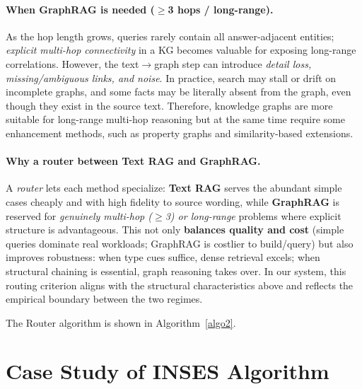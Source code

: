 \documentclass{article}
\theoremstyle{plain}
\theoremstyle{definition}
\theoremstyle{remark}
\begin{document}
\paragraph{When GraphRAG is needed (\texorpdfstring{$\ge$}{>=}3 hops / long-range).}
As the hop length grows, queries rarely contain all answer-adjacent entities; \emph{explicit multi-hop connectivity} in a KG becomes valuable for exposing long-range correlations. However, the text$\to$graph step can introduce \emph{detail loss, missing/ambiguous links, and noise}. In practice, search may stall or drift on incomplete graphs, and some facts may be literally absent from the graph, even though they exist in the source text. Therefore, knowledge graphs are more suitable for long-range multi-hop reasoning but at the same time require some enhancement methods, such as property graphs and similarity-based extensions.

\paragraph{Why a router between Text RAG and GraphRAG.}
A \emph{router} lets each method specialize: \textbf{Text RAG} serves the abundant simple cases cheaply and with high fidelity to source wording, while \textbf{GraphRAG} is reserved for \emph{genuinely multi-hop ($\ge$3) or long-range} problems where explicit structure is advantageous. This not only \textbf{balances quality and cost} (simple queries dominate real workloads; GraphRAG is costlier to build/query) but also improves robustness: when type cues suffice, dense retrieval excels; when structural chaining is essential, graph reasoning takes over. In our system, this routing criterion aligns with the structural characteristics above and reflects the empirical boundary between the two regimes.

The Router algorithm is shown in Algorithm~\ref{algo2}.


\section{Case Study of INSES Algorithm} \label{EE}
\end{document}
